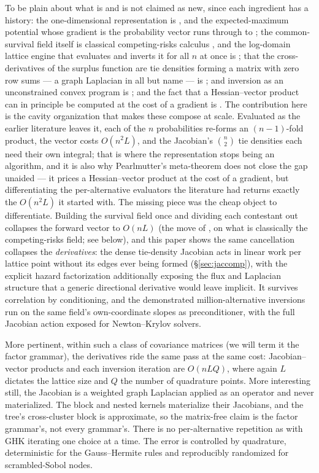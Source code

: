 \documentclass[11pt]{article}
\begin{document}
To be plain about what is and is not claimed as new, since each
ingredient has a history: the one-dimensional representation is
\citet{domencich1975}, and the expected-maximum potential whose gradient
is the probability vector runs through \citet{mcfadden1981} to
\citet{fosgerau2013}; the common-survival field itself is classical competing-risks calculus
\citep{kalbfleisch2002}, and the log-domain lattice engine that evaluates
and inverts it for all $n$ at once is \citet{cotton2021}; that the cross-derivatives of the surplus function
are tie densities forming a matrix with zero row sums --- a graph
Laplacian in all but name --- is \citet{muller2022}; and inversion as an
unconstrained convex program is \citet{li2018}; and the fact that a
Hessian--vector product can in principle be computed at the cost of a
gradient is \citet{pearlmutter1994}. The contribution here is the cavity
organization that makes these compose at scale. Evaluated as the earlier
literature leaves it, each of the $n$ probabilities re-forms an
$(n-1)$-fold product, the vector costs $O(n^2L)$, and the Jacobian's
$\binom{n}{2}$ tie densities each need their own integral; that is where
the representation stops being an algorithm, and it is also why
Pearlmutter's meta-theorem does not close the gap unaided --- it prices a
Hessian--vector product at the cost of a gradient, but differentiating
the per-alternative evaluators the literature had returns exactly the
$O(n^2L)$ it started with. The missing piece was the cheap object to
differentiate. Building the survival field once and dividing each
contestant out collapses the forward vector to $O(nL)$ (the move of
\citealt{cotton2021}, on what is classically the competing-risks field;
see below), and this paper shows the same cancellation collapses the
\emph{derivatives}: the dense tie-density Jacobian acts in linear work
per lattice point without its edges ever being formed
(\S\ref{sec:jaccomp}), with the explicit hazard factorization
additionally exposing the flux and Laplacian structure that a generic
directional derivative would leave implicit. It survives correlation by
conditioning, and the demonstrated million-alternative inversions run on
the same field's own-coordinate slopes as preconditioner, with the full
Jacobian action exposed for Newton--Krylov solvers.

More pertinent, within such a class of covariance matrices (we will term it the factor grammar), the derivatives ride the same pass at the same cost: Jacobian--vector products and each inversion iteration are $O(nLQ)$, where again $L$ dictates the lattice size and $Q$ the number of quadrature points. More interesting still, the Jacobian is a weighted graph Laplacian applied as an operator and never materialized. The block and nested kernels materialize their Jacobians,
and the tree's cross-cluster block is approximate, so the matrix-free
claim is the factor grammar's, not every grammar's. There is no per-alternative
repetition as with GHK iterating one choice at a time. The error is controlled by quadrature, deterministic for the Gauss--Hermite rules and reproducibly randomized for
scrambled-Sobol nodes.
\end{document}
